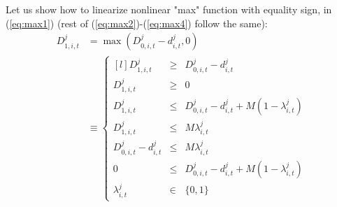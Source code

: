 \documentclass[11pt,letter]{article}
\begin{document}
\noindent
Let us show how to linearize nonlinear "max" function with equality sign, in (\ref{eq:max1}) (rest of (\ref{eq:max2})-(\ref{eq:max4}) follow the same):
\begin{align}
D_{1,i,t}^{j} & = \max(D_{0,i,t}^{j}-d_{i,t}^{j},0) 
\qquad \qquad \qquad \qquad \qquad \nonumber \\
& \equiv
\left\{
\begin{matrix*}[l]
D_{1,i,t}^{j} & \geq & D_{0,i,t}^{j}-d_{i,t}^{j} \\
D_{1,i,t}^{j} & \geq & 0 \\
D_{1,i,t}^{j} & \leq & D_{0,i,t}^{j}-d_{i,t}^{j} + M (1-\lambda_{i,t}^{j}) \\
D_{1,i,t}^{j} & \leq & M \lambda_{i,t}^{j}\\
D_{0,i,t}^{j}-d_{i,t}^{j} & \leq & M \lambda_{i,t}^{j} \\
0 & \leq & D_{0,i,t}^{j}-d_{i,t}^{j} + M (1- \lambda_{i,t}^{j}) \\
\lambda_{i,t}^{j} & \in & \{0,1\}
\end{matrix*} \right.
\end{align}
\end{document}
